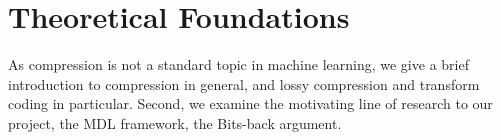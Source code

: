 \section{Theoretical Foundations}
\label{sec:theoretical_foundations}
\par
As compression is not a standard topic in machine learning, we give a brief
introduction to compression in general, and lossy compression and transform
coding in particular. Second, we examine the motivating line of research to
our project, the MDL framework, the Bits-back argument.
